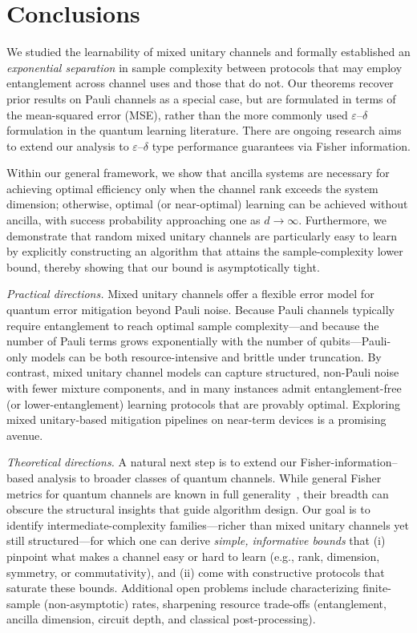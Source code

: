 \documentclass[12pt]{article}
\begin{document}
\section{Conclusions}

We studied the learnability of mixed unitary channels and formally established an \emph{exponential separation} in sample complexity between protocols that may employ entanglement across channel uses and those that do not. Our theorems recover prior results on Pauli channels as a special case, but are formulated in terms of the mean\mbox{-}squared error (MSE), rather than the more commonly used $\varepsilon$--$\delta$ formulation in the quantum learning literature. There are ongoing research aims to extend our analysis to $\varepsilon$--$\delta$ type performance guarantees via Fisher information.

Within our general framework, we show that ancilla systems are necessary for achieving optimal efficiency only when the channel rank exceeds the system dimension; otherwise, optimal (or near\mbox{-}optimal) learning can be achieved without ancilla, with success probability approaching one as $d \to \infty$. Furthermore, we demonstrate that random mixed unitary channels are particularly easy to learn by explicitly constructing an algorithm that attains the sample\mbox{-}complexity lower bound, thereby showing that our bound is asymptotically tight.

\textit{Practical directions.} Mixed unitary channels offer a flexible error model for quantum error mitigation beyond Pauli noise. Because Pauli channels typically require entanglement to reach optimal sample complexity---and because the number of Pauli terms grows exponentially with the number of qubits---Pauli\mbox{-}only models can be both resource\mbox{-}intensive and brittle under truncation. By contrast, mixed unitary channel models can capture structured, non\mbox{-}Pauli noise with fewer mixture components, and in many instances admit entanglement\mbox{-}free (or lower\mbox{-}entanglement) learning protocols that are provably optimal. Exploring mixed unitary\mbox{-}based mitigation pipelines on near\mbox{-}term devices is a promising avenue. 

\textit{Theoretical directions.} A natural next step is to extend our Fisher\mbox{-}information--based analysis to broader classes of quantum channels. While general Fisher metrics for quantum channels are known in full generality~\cite{yuan2017fidelity}, their breadth can obscure the structural insights that guide algorithm design. Our goal is to identify intermediate\mbox{-}complexity families---richer than mixed unitary channels yet still structured---for which one can derive \emph{simple, informative bounds} that (i) pinpoint what makes a channel easy or hard to learn (e.g., rank, dimension, symmetry, or commutativity), and (ii) come with constructive protocols that saturate these bounds. Additional open problems include characterizing finite\mbox{-}sample (non\mbox{-}asymptotic) rates, sharpening resource trade\mbox{-}offs (entanglement, ancilla dimension, circuit depth, and classical post\mbox{-}processing).
\end{document}
